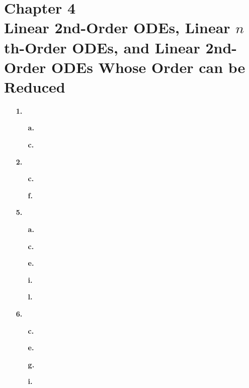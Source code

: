 
\section{Chapter 4\\{\large Linear 2nd-Order ODEs, Linear \(n\)th-Order ODEs, and Linear 2nd-Order ODEs
Whose Order can be Reduced}}

\begin{enumerate}
	\setlength{\itemsep}{\bigskipamount}
	\item[\textbf{1.}]
		\begin{enumerate}
			\item[\textbf{a.}]


			\item[\textbf{c.}]


		\end{enumerate}


	\item[\textbf{2.}]
		\begin{enumerate}
			\item[\textbf{c.}]


			\item[\textbf{f.}]


		\end{enumerate}


	\item[\textbf{5.}]
		\begin{enumerate}
			\item[\textbf{a.}]


			\item[\textbf{c.}]


			\item[\textbf{e.}]


			\item[\textbf{i.}]


			\item[\textbf{l.}]


		\end{enumerate}


	\item[\textbf{6.}]
		\begin{enumerate}
			\item[\textbf{c.}]


			\item[\textbf{e.}]


			\item[\textbf{g.}]


			\item[\textbf{i.}]


		\end{enumerate}
\end{enumerate}